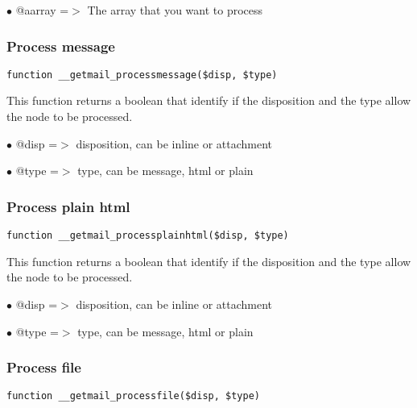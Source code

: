 \documentclass[a4paper]{article}
\begin{document}
\begin{compactitem}
\item[\color{myblue}$\bullet$] @aarray =$>$ The array that you want to process
\end{compactitem}

\hypertarget{toc33}{}
\subsubsection{Process message}

\begin{lstlisting}
function __getmail_processmessage($disp, $type)
\end{lstlisting}

This function returns a boolean that identify if the disposition and the type
allow the node to be processed.

\begin{compactitem}
\item[\color{myblue}$\bullet$] @disp =$>$ disposition, can be inline or attachment
\item[\color{myblue}$\bullet$] @type =$>$ type, can be message, html or plain
\end{compactitem}

\hypertarget{toc34}{}
\subsubsection{Process plain html}

\begin{lstlisting}
function __getmail_processplainhtml($disp, $type)
\end{lstlisting}

This function returns a boolean that identify if the disposition and the type
allow the node to be processed.

\begin{compactitem}
\item[\color{myblue}$\bullet$] @disp =$>$ disposition, can be inline or attachment
\item[\color{myblue}$\bullet$] @type =$>$ type, can be message, html or plain
\end{compactitem}

\hypertarget{toc35}{}
\subsubsection{Process file}

\begin{lstlisting}
function __getmail_processfile($disp, $type)
\end{lstlisting}
\end{document}
